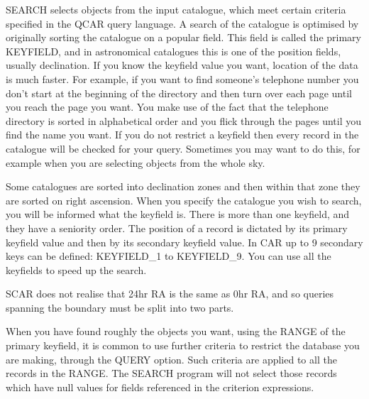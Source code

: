 SEARCH selects objects from the input catalogue, which meet certain criteria
specified in the QCAR query language.
A search of the catalogue is optimised by originally sorting the catalogue 
on a popular field.
This field is called the primary KEYFIELD, and in astronomical catalogues 
this is one of the position fields, usually declination. 
If you know the keyfield value you want, location of the data is much faster.
For example, if you want to find someone's telephone number you don't start 
at the beginning of the directory and then turn over each page until you 
reach the page you want.  
You make use of the fact that the telephone directory is sorted in 
alphabetical order and you flick through the pages until you find the name 
you want.
If you do not restrict a keyfield then every record in the catalogue will be 
checked for your query.  
Sometimes you may want to do this, for example when you are selecting objects 
from the whole sky.

Some catalogues are sorted into declination  zones  and  then  within
that zone they are sorted on right ascension.  
When you specify the catalogue you wish to search, you will be informed what
the keyfield is.
There is more than one keyfield, and they have a seniority order.   
The position of a record is dictated by its primary keyfield value and then 
by its secondary keyfield value.  
In CAR up to 9 secondary keys can be defined: KEYFIELD\_1 to KEYFIELD\_9.  
You can use all the keyfields to speed up the search.

SCAR does not realise that 24hr RA is the same as 0hr RA, and so queries
spanning the boundary must be split into two parts.

When you have found roughly the objects you want, using the RANGE of the 
primary keyfield, it is common to use further criteria to restrict the 
database you are making, through the QUERY option.  
Such criteria are applied to all the records in the RANGE.
The SEARCH program will not select those records which have null values for 
fields referenced in the criterion expressions.

